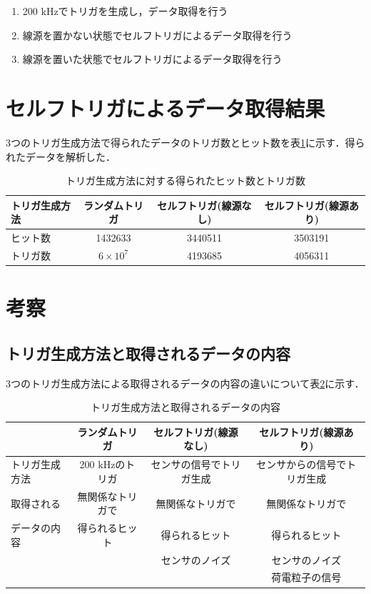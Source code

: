\begin{enumerate}
\item 200 $\mathrm{kHz}$でトリガを生成し，データ取得を行う
\item 線源を置かない状態でセルフトリガによるデータ取得を行う
\item 線源を置いた状態でセルフトリガによるデータ取得を行う
\end{enumerate}


\section{セルフトリガによるデータ取得結果}
\label{sec:selfconc}
3つのトリガ生成方法で得られたデータのトリガ数とヒット数を表\ref{tab:self}に示す．得られたデータを解析した．

\begin{table}[h]
  \centering
  \caption{トリガ生成方法に対する得られたヒット数とトリガ数}
  \begin{tabular} {l|ccc} \hline
    トリガ生成方法 & ランダムトリガ & セルフトリガ(線源なし) & セルフトリガ(線源あり) \\ \hline \hline
    ヒット数 & 1432633 & 3440511 & 3503191\\
    トリガ数 & $6 \times 10^7$ & 4193685 & 4056311 \\ \hline
  \end{tabular}
  \label{tab:self}
\end{table}

\section{考察}
\label{sec:selfsum}

\subsection*{トリガ生成方法と取得されるデータの内容}
3つのトリガ生成方法による取得されるデータの内容の違いについて表\ref{tab:selfdata}に示す．

\begin{table}[h]
  \centering
  \caption{トリガ生成方法と取得されるデータの内容}
  \begin{tabular} {l|ccc} \hline
    & ランダムトリガ & セルフトリガ(線源なし) & セルフトリガ(線源あり) \\ \hline \hline
    トリガ生成方法 & 200 $\mathrm{kHz}$のトリガ & センサの信号でトリガ生成 & センサからの信号でトリガ生成 \\ \hline 
    取得される & 無関係なトリガで & 無関係なトリガで & 無関係なトリガで\\
    データの内容 & 得られるヒット & 得られるヒット & 得られるヒット \\
    & & センサのノイズ & センサのノイズ \\
    & & & 荷電粒子の信号\\ \hline
  \end{tabular}
  \label{tab:selfdata}
\end{table}

